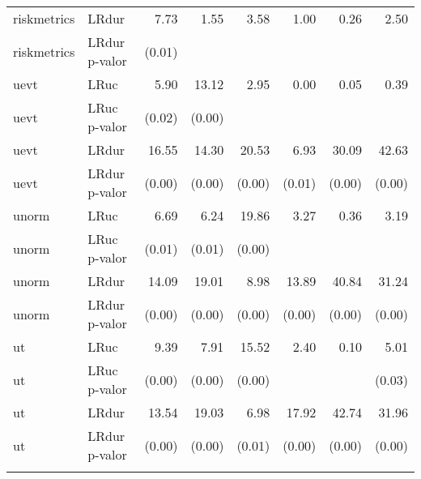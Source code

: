 \begin{longtable}{llrrrrrr}
  riskmetrics & LRdur & 7.73 & 1.55 & 3.58 & 1.00 & 0.26 & 2.50 \\ 
  riskmetrics & LRdur p-valor & (0.01) &  &  &  &  &  \\ 
  uevt & LRuc & 5.90 & 13.12 & 2.95 & 0.00 & 0.05 & 0.39 \\ 
  uevt & LRuc p-valor & (0.02) & (0.00) &  &  &  &  \\ 
  uevt & LRdur & 16.55 & 14.30 & 20.53 & 6.93 & 30.09 & 42.63 \\ 
  uevt & LRdur p-valor & (0.00) & (0.00) & (0.00) & (0.01) & (0.00) & (0.00) \\ 
  unorm & LRuc & 6.69 & 6.24 & 19.86 & 3.27 & 0.36 & 3.19 \\ 
  unorm & LRuc p-valor & (0.01) & (0.01) & (0.00) &  &  &  \\ 
  unorm & LRdur & 14.09 & 19.01 & 8.98 & 13.89 & 40.84 & 31.24 \\ 
  unorm & LRdur p-valor & (0.00) & (0.00) & (0.00) & (0.00) & (0.00) & (0.00) \\ 
  ut & LRuc & 9.39 & 7.91 & 15.52 & 2.40 & 0.10 & 5.01 \\ 
  ut & LRuc p-valor & (0.00) & (0.00) & (0.00) &  &  & (0.03) \\ 
  ut & LRdur & 13.54 & 19.03 & 6.98 & 17.92 & 42.74 & 31.96 \\ 
  ut & LRdur p-valor & (0.00) & (0.00) & (0.01) & (0.00) & (0.00) & (0.00) \\ 
   \hline
\hline
\label{tab:vartest}
\end{longtable}

